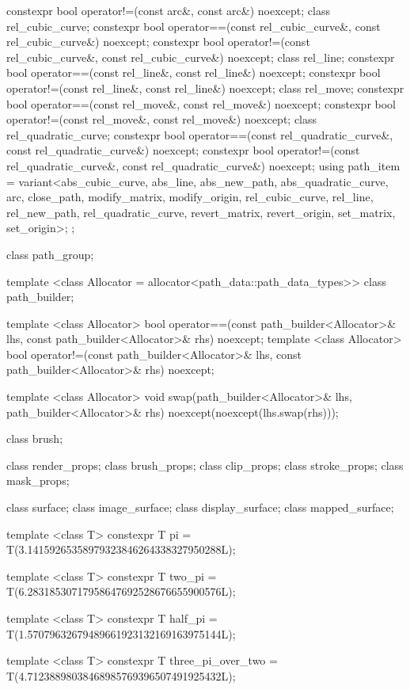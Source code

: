 \begin{codeblock}
{{{{{    constexpr bool operator!=(const arc&, const arc&) noexcept;
    class rel_cubic_curve;
    constexpr bool operator==(const rel_cubic_curve&, const rel_cubic_curve&) 
      noexcept;
    constexpr bool operator!=(const rel_cubic_curve&, const rel_cubic_curve&) 
      noexcept;
    class rel_line;
    constexpr bool operator==(const rel_line&, const rel_line&) noexcept;
    constexpr bool operator!=(const rel_line&, const rel_line&) noexcept;
    class rel_move;
    constexpr bool operator==(const rel_move&, const rel_move&) noexcept;
    constexpr bool operator!=(const rel_move&, const rel_move&) noexcept;
    class rel_quadratic_curve;
    constexpr bool operator==(const rel_quadratic_curve&,
      const rel_quadratic_curve&) noexcept;
    constexpr bool operator!=(const rel_quadratic_curve&,
      const rel_quadratic_curve&) noexcept;
    using path_item = variant<abs_cubic_curve, abs_line, abs_new_path,
      abs_quadratic_curve, arc, close_path, modify_matrix, modify_origin,
      rel_cubic_curve, rel_line, rel_new_path, rel_quadratic_curve, 
      revert_matrix, revert_origin, set_matrix, set_origin>;
  };
  
  class path_group;

  template <class Allocator = allocator<path_data::path_data_types>>
  class path_builder;

  template <class Allocator>
  bool operator==(const path_builder<Allocator>& lhs, 
    const path_builder<Allocator>& rhs) noexcept;
  template <class Allocator>
  bool operator!=(const path_builder<Allocator>& lhs, 
    const path_builder<Allocator>& rhs) noexcept;
  
  template <class Allocator>
  void swap(path_builder<Allocator>& lhs, path_builder<Allocator>& rhs)
    noexcept(noexcept(lhs.swap(rhs)));
  
  class brush;

  class render_props;
  class brush_props;
  class clip_props;
  class stroke_props;
  class mask_props;
    
  class surface;
  class image_surface;
  class display_surface;
  class mapped_surface;
  
  template <class T>
  constexpr T pi = T(3.14159265358979323846264338327950288L);
  
  template <class T>
  constexpr T two_pi = T(6.28318530717958647692528676655900576L);
  
  template <class T>
  constexpr T half_pi = T(1.57079632679489661923132169163975144L);
  
  template <class T>
  constexpr T three_pi_over_two = T(4.71238898038468985769396507491925432L);
  
}}}}
\end{codeblock}

